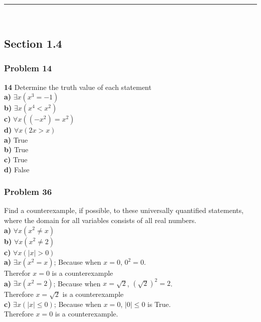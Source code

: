 \documentclass[paper=a4, fontsize=11pt]{scrartcl} %
\newcommand{\horrule}[1]{\rule{\linewidth}{#1}} %
\begin{document}
\horrule{0.5pt} \\ %
\subsection*{Section 1.4}
\subsubsection*{Problem 14}

\textbf{14} Determine the truth value of each statement\\
\textbf{a)} $\exists x(x^3 = -1)$\\
\textbf{b)} $\exists x(x^4 < x^2)$\\
\textbf{c)} $\forall x((-x^2) = x^2)$\\
\textbf{d)} $\forall x(2x > x)$\\

\textbf{a)} True\\
\textbf{b)} True\\
\textbf{c)} True\\
\textbf{d)} False\\

\subsubsection*{Problem 36}
Find a counterexample, if possible, to these universally
quantified statements, where the domain for all variables
consists of all real numbers.\\

\textbf{a)} $\forall x(x^2 \ne x)$\\
\textbf{b)} $\forall x(x^2 \ne 2)$\\
\textbf{c)} $\forall x(|x| > 0)$\\

\textbf{a)} $\exists x(x^2 = x)$; Because when $x=0$, $0^2=0$.\\ 
Therefor $x=0$ is a counterexample\\
\textbf{a)} $\exists x(x^2 = 2)$; Because when $x = \sqrt{2}$, $(\sqrt{2})^2 = 2$.\\ 
Therefore $x=\sqrt{2}$ is a counterexample\\
\textbf{c)} $\exists x(|x| \le 0)$; Because when $x=0$, $|0| \le 0$ is True.\\
Therefore $x=0$ is a counterexample.

\end{document}
